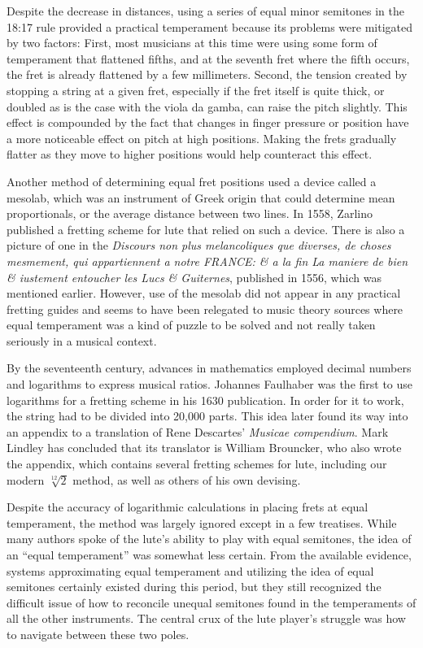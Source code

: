 Despite the decrease in distances, using a series of equal minor semitones in the 18:17 rule provided a practical
temperament because its problems were mitigated by two factors: First, most musicians at this time were using some form
of temperament that flattened fifths, and at the seventh fret where the fifth occurs, the fret is already flattened by a
few millimeters. Second, the tension created by stopping a string at a given fret, especially if the fret itself is
quite thick, or doubled as is the case with the viola da gamba, can raise the pitch slightly. \autocite[21]{ML:1} This
effect is compounded by the fact that changes in finger pressure or position have a more noticeable effect on pitch at
high positions. Making the frets gradually flatter as they move to higher positions would help counteract this effect.

Another method of determining equal fret positions used a device called a mesolab, which was an instrument of Greek
origin that could determine mean proportionals, or the average distance between two lines. In 1558, Zarlino published a
fretting scheme for lute that relied on such a device. \autocite[26]{ML:1} There is also a picture of one in the
\textit{Discours non plus melancoliques que diverses, de choses mesmement, qui appartiennent a notre FRANCE: \& a la fin
La maniere de bien \& iustement entoucher les Lucs \& Guiternes}, published in 1556, which was mentioned earlier.
However, use of the mesolab did not appear in any practical fretting guides and seems to have been relegated to music
theory sources where equal temperament was a kind of puzzle to be solved and not really taken seriously in a musical
context.

By the seventeenth century, advances in mathematics employed decimal numbers and logarithms to express musical ratios.
Johannes Faulhaber was the first to use logarithms for a fretting scheme in his 1630 publication. \autocite[21]{ML:1}
In order for it to work, the string had to be divided into 20,000 parts. This idea later found its way into an appendix
to a translation of Rene Descartes' \textit{Musicae compendium}. Mark Lindley has concluded that its translator is
William Brouncker, who also wrote the appendix, which contains several fretting schemes for lute, including our modern $
\sqrt[12]{2} $ method, as well as others of his own devising.

Despite the accuracy of logarithmic calculations in placing frets at equal temperament, the method was largely ignored
except in a few treatises. While many authors spoke of the lute's ability to play with equal semitones, the idea of an
``equal temperament'' was somewhat less certain. From the available evidence, systems approximating equal temperament
and utilizing the idea of equal semitones certainly existed during this period, but they still recognized the difficult
issue of how to reconcile unequal semitones found in the temperaments of all the other instruments. The central crux of
the lute player's struggle was how to navigate between these two poles.

